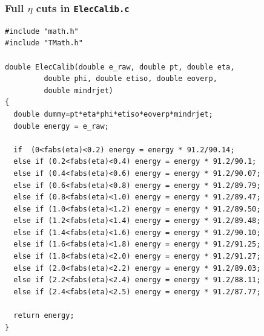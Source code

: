 \subsubsection{Full $η$ cuts in \texttt{ElecCalib.c}}
\begin{lstlisting}
#include "math.h"
#include "TMath.h"

double ElecCalib(double e_raw, double pt, double eta,
		 double phi, double etiso, double eoverp,
		 double mindrjet)
{
  double dummy=pt*eta*phi*etiso*eoverp*mindrjet;
  double energy = e_raw;

  if  (0<fabs(eta)<0.2) energy = energy * 91.2/90.14;
  else if (0.2<fabs(eta)<0.4) energy = energy * 91.2/90.1;
  else if (0.4<fabs(eta)<0.6) energy = energy * 91.2/90.07;
  else if (0.6<fabs(eta)<0.8) energy = energy * 91.2/89.79;
  else if (0.8<fabs(eta)<1.0) energy = energy * 91.2/89.47;
  else if (1.0<fabs(eta)<1.2) energy = energy * 91.2/89.50;
  else if (1.2<fabs(eta)<1.4) energy = energy * 91.2/89.48;
  else if (1.4<fabs(eta)<1.6) energy = energy * 91.2/90.10;
  else if (1.6<fabs(eta)<1.8) energy = energy * 91.2/91.25;
  else if (1.8<fabs(eta)<2.0) energy = energy * 91.2/91.27;
  else if (2.0<fabs(eta)<2.2) energy = energy * 91.2/89.03;
  else if (2.2<fabs(eta)<2.4) energy = energy * 91.2/88.11;
  else if (2.4<fabs(eta)<2.5) energy = energy * 91.2/87.77;

  return energy;
}
\end{lstlisting}


